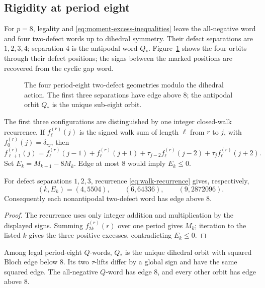 \FloatBarrier
\subsection{Rigidity at period eight}

For $p=8$, legality and \eqref{eq:moment-excess-inequalities} leave the
all-negative word and four two-defect words up to dihedral symmetry.  Their
defect separations are $1,2,3,4$; separation $4$ is the antipodal word $Q_*$.
Figure~\ref{fig:defect-orbits} shows the four orbits through their defect
positions; the signs between the marked positions are recovered from the
cyclic gap word.

\begin{figure}[t]
 \centering
 
 \caption{The four period-eight two-defect geometries modulo the dihedral
 action.  The first three separations have edge above $8$; the antipodal orbit
 $Q_*$ is the unique sub-eight orbit.}
 \label{fig:defect-orbits}
\end{figure}

The first three configurations are distinguished by one integer closed-walk
recurrence.  If $f_\ell^{(r)}(j)$ is the signed walk sum of length $\ell$ from
$r$ to $j$, with $f_0^{(r)}(j)=\delta_{rj}$, then
\begin{equation}
 f_{\ell+1}^{(r)}(j)=f_\ell^{(r)}(j-1)+f_\ell^{(r)}(j+1)
 +\tau_{j-2}f_\ell^{(r)}(j-2)+\tau_jf_\ell^{(r)}(j+2).
 \label{eq:walk-recurrence}
\end{equation}
Set $E_k=M_{k+1}-8M_k$.  Edge at most $8$ would imply $E_k\leq0$.

\begin{lemma}
\label{lem:period8-recurrence}
For defect separations $1,2,3$, recurrence \eqref{eq:walk-recurrence} gives,
respectively,
\begin{equation}
 (k,E_k)=(4,5504),\qquad(6,64336),\qquad(9,2872096).
 \label{eq:period8-excesses}
\end{equation}
Consequently each nonantipodal two-defect word has edge above $8$.
\end{lemma}

\begin{proof}
The recurrence uses only integer addition and multiplication by the displayed
signs.  Summing $f_{2k}^{(r)}(r)$ over one period gives $M_k$; iteration to the
listed $k$ gives the three positive excesses, contradicting $E_k\leq0$.
\end{proof}

\begin{theorem}
\label{thm:period8-trichotomy}
Among legal period-eight $Q$-words, $Q_*$ is the unique dihedral orbit with
squared Bloch edge below $8$.  Its two $\tau$-lifts differ by a global sign and
have the same squared edge.  The all-negative $Q$-word has edge $8$, and every
other orbit has edge above $8$.
\end{theorem}

